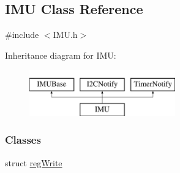 \hypertarget{class_i_m_u}{
\subsection{IMU Class Reference}
\label{class_i_m_u}
}


{\ttfamily \#include $<$IMU.h$>$}

Inheritance diagram for IMU:\begin{figure}[H]
\begin{center}
\leavevmode
\includegraphics[height=2.000000cm]{class_i_m_u}
\end{center}
\end{figure}
\subsubsection*{Classes}
\begin{DoxyCompactItemize}
\item 
struct \hyperlink{struct_i_m_u_1_1reg_write}{regWrite}
\end{DoxyCompactItemize}
